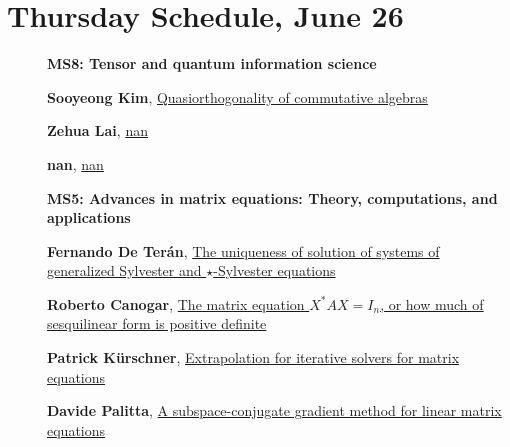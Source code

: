 \documentclass[ILAS2025-program.tex]{subfiles}
\begin{document}
\section*{Thursday Schedule, June 26 }
        
        \begin{description}
    \item[] {\color{mstitle}\textbf{MS8: Tensor and quantum information science}} 
    \item[] \hypertarget{up0283}{}\textbf{Sooyeong Kim}, \hyperlink{down0283}{Quasiorthogonality of commutative algebras
}
        \item[] \hypertarget{up0284}{}\textbf{Zehua Lai}, \hyperlink{down0284}{nan}
        \item[] \hypertarget{up0285}{}\textbf{nan}, \hyperlink{down0285}{nan}
        \end{description}
    \begin{description}
    \item[] {\color{mstitle}\textbf{MS5: Advances in matrix equations: Theory, computations, and applications}} 
    \item[] \hypertarget{up0319}{}\textbf{Fernando De Terán}, \hyperlink{down0319}{The uniqueness of solution of systems of generalized Sylvester and $\star$-Sylvester equations}
        \item[] \hypertarget{up0320}{}\textbf{Roberto Canogar}, \hyperlink{down0320}{The matrix equation $X^*AX=I_n$, or how much of sesquilinear form is positive definite
}
        \item[] \hypertarget{up0321}{}\textbf{Patrick Kürschner}, \hyperlink{down0321}{Extrapolation for iterative solvers for matrix equations
}
        \item[] \hypertarget{up0322}{}\textbf{Davide Palitta}, \hyperlink{down0322}{A subspace-conjugate gradient method for linear matrix equations
}
        \end{description}
\end{document}
